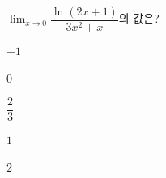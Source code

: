 $\displaystyle\lim_{x\to 0}\dfrac{\ln(2x+1)}{3x^2+x}$의 값은?
\begin{choices32}{\rule[-3ex]{0pt}{8ex}$-1$}{\rule[-3ex]{0pt}{8ex}$0$}{\rule[-3ex]{0pt}{8ex}$\dfrac{2}{3}$}{\rule[-3ex]{0pt}{8ex}$1$}{\rule[-3ex]{0pt}{8ex}$2$}\end{choices32}
